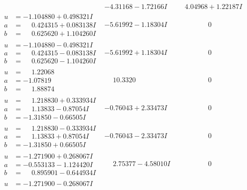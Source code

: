 \documentclass[1p]{elsarticle_modified}
\theoremstyle{definition}
\begin{document}
$$\begin{array}{c|c|c}
 & -4.31168 - 1.72166 I & \phantom{-}4.04968 + 1.22187 I \\ \hline\begin{aligned}
u &= -1.104880 + 0.498321 I \\
a &= \phantom{-}0.424315 + 0.083138 I \\
b &= \phantom{-}0.625620 + 1.104260 I\end{aligned}
 & -5.61992 - 1.18304 I & \phantom{-0.000000 } 0 \\ \hline\begin{aligned}
u &= -1.104880 - 0.498321 I \\
a &= \phantom{-}0.424315 - 0.083138 I \\
b &= \phantom{-}0.625620 - 1.104260 I\end{aligned}
 & -5.61992 + 1.18304 I & \phantom{-0.000000 } 0 \\ \hline\begin{aligned}
u &= \phantom{-}1.22068\phantom{ +0.000000I} \\
a &= -1.07819\phantom{ +0.000000I} \\
b &= \phantom{-}1.88874\phantom{ +0.000000I}\end{aligned}
 & \phantom{-}10.3320\phantom{ +0.000000I} & \phantom{-0.000000 } 0 \\ \hline\begin{aligned}
u &= \phantom{-}1.218830 + 0.333934 I \\
a &= \phantom{-}1.13833 - 0.87054 I \\
b &= -1.31850 - 0.66505 I\end{aligned}
 & -0.76043 + 2.33473 I & \phantom{-0.000000 } 0 \\ \hline\begin{aligned}
u &= \phantom{-}1.218830 - 0.333934 I \\
a &= \phantom{-}1.13833 + 0.87054 I \\
b &= -1.31850 + 0.66505 I\end{aligned}
 & -0.76043 - 2.33473 I & \phantom{-0.000000 } 0 \\ \hline\begin{aligned}
u &= -1.271900 + 0.268067 I \\
a &= -0.553133 - 1.124420 I \\
b &= \phantom{-}0.895901 - 0.644934 I\end{aligned}
 & \phantom{-}2.75377 - 4.58010 I & \phantom{-0.000000 } 0 \\ \hline\begin{aligned}
u &= -1.271900 - 0.268067 I \\

\end{aligned}
\end{array}$$
\end{document}
